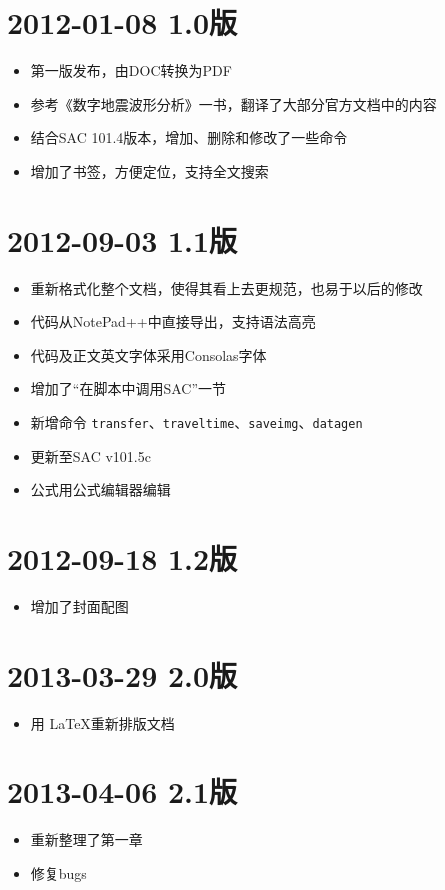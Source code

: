 \section*{2012-01-08 1.0版}
\begin{itemize}
\item 第一版发布，由DOC转换为PDF
\item 参考《数字地震波形分析》一书，翻译了大部分官方文档中的内容
\item 结合SAC 101.4版本，增加、删除和修改了一些命令
\item 增加了书签，方便定位，支持全文搜索
\end{itemize}

\section*{2012-09-03 1.1版}
\begin{itemize}
\item 重新格式化整个文档，使得其看上去更规范，也易于以后的修改
\item 代码从NotePad++中直接导出，支持语法高亮
\item 代码及正文英文字体采用Consolas字体
\item 增加了``在脚本中调用SAC''一节
\item 新增命令 \texttt{transfer}、\texttt{traveltime}、\texttt{saveimg}、\texttt{datagen}
\item 更新至SAC v101.5c
\item 公式用公式编辑器编辑
\end{itemize}

\section*{2012-09-18 1.2版}
\begin{itemize}
\item 增加了封面配图
\end{itemize}

\section*{2013-03-29 2.0版}
\begin{itemize}
\item 用 \LaTeX 重新排版文档
\end{itemize}

\section*{2013-04-06 2.1版}
\begin{itemize}
\item 重新整理了第一章
\item 修复bugs
\end{itemize}

